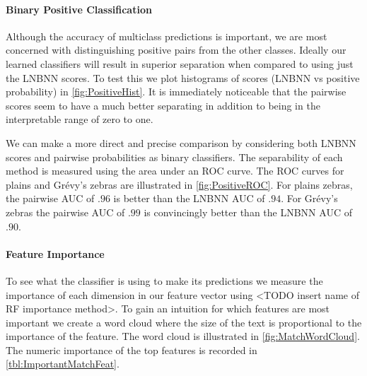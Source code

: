         \paragraph{Binary Positive Classification}
        Although the accuracy of multiclass predictions is important, we are most concerned with distinguishing
          positive pairs from the other classes.
        Ideally our learned classifiers will result in superior separation when compared to using just the LNBNN
          scores.
        To test this we plot histograms of scores (LNBNN vs positive probability) in \cref{fig:PositiveHist}.
        It is immediately noticeable that the pairwise scores seem to have a much better separating in addition
          to being in the interpretable range of zero to one.


        \PositiveHist{}

        We can make a more direct and precise comparison by considering both LNBNN scores and pairwise
          probabilities as binary classifiers.
        The separability of each method is measured using the area under an ROC curve.
        The ROC curves for plains and Grévy's zebras are illustrated in \cref{fig:PositiveROC}.
        For plains zebras, the pairwise AUC of $.96$ is better than the LNBNN AUC of $.94$.
        For Grévy's zebras the pairwise AUC of $.99$ is convincingly better than the LNBNN AUC of $.90$.

        \PositiveROC{}


        \paragraph{Feature Importance}
        To see what the classifier is using to make its predictions we measure the importance of each dimension
          in our feature vector using <TODO insert name of RF importance method>.
        To gain an intuition for which features are most important we create a word cloud where the size of the
          text is proportional to the importance of the feature.
        The word cloud is illustrated in \cref{fig:MatchWordCloud}.
        The numeric importance of the top features is recorded in \cref{tbl:ImportantMatchFeat}.

